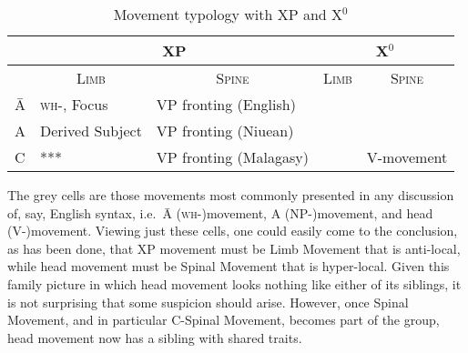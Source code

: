 \documentclass[output=paper,colorlinks,citecolor=brown,
]{langscibook}
\begin{document}
\begin{table}
\caption{Movement typology with XP and X$^0$}
\label{tab:table}
\footnotesize
\begin{tabular}{ l  l  l  l  l }
\hline
\hline
& \multicolumn{2}{c}{XP} & \multicolumn{2}{c}{X$^0$} \\
\hline
&\multicolumn{1}{c}{\textsc{Limb}} & \multicolumn{1}{c}{\textsc{Spine}} & \multicolumn{1}{c}{\textsc{Limb}} & \multicolumn{1}{c}{\textsc{Spine}} \\
\hline
\hline
\=A & \cellcolor{Gray}\textsc{wh-}, Focus & VP fronting (English) &  &  \\
\hline
A  & \cellcolor{Gray}Derived Subject&  VP fronting (Niuean)   &  &  \\
\hline
C  & ***  &    VP fronting (Malagasy) &  &  \cellcolor{Gray} V-movement\\
\hline
\hline
\end{tabular}
\end{table}


The grey cells are those movements most commonly presented in any discussion of, say, English syntax, i.e.\ \=A (\textsc{wh-})movement, A (NP-)movement, and head (V-)movement.  Viewing just these cells, one could easily come to the conclusion, as has been done, that XP movement must be Limb Movement that is anti-local, while head movement must be Spinal Movement that is hyper-local.  Given this family picture in which head movement looks nothing like either of its siblings, it is not surprising that some suspicion should arise.  However, once Spinal Movement, and in particular C-Spinal Movement, becomes part of the group, head movement now has a sibling with shared traits.
\end{document}
